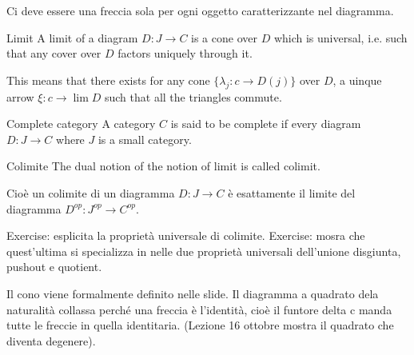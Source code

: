 \documentclass[a4paper]{article}
\begin{document}
Ci deve essere una freccia sola per ogni oggetto caratterizzante nel diagramma.

\begin{snippetdefinition}{Limit}
    A limit of a diagram \(D \colon J \to C\) is a cone over \(D\)
    which is universal, i.e. such that any cover over \(D\)
    factors uniquely through it.
\end{snippetdefinition}
\begin{center}
\end{center}
This means that there exists for any cone
\(\{\lambda_j \colon c \to D(j)\}\) over \(D\), a uinque arrow
\(\xi \colon c \to \lim D\) such that all the triangles commute.

\begin{snippetdefinition}{Complete category}
    A category \(C\) is said to be complete if every diagram
    \(D \colon J \to C\) where \(J\) is a small category.
\end{snippetdefinition}

\begin{snippetdefinition}{Colimite}
    The dual notion of the notion of limit is called colimit.
\end{snippetdefinition}

Cioè un colimite di un diagramma \(D \colon J \to C\)
è esattamente il limite del diagramma \(D^{op} \colon J^{op} \to C^{op}\).

Exercise: esplicita la proprietà universale di colimite. 
Exercise: mosra che quest'ultima si specializza in nelle due proprietà universali
dell'unione disgiunta, pushout e quotient.

Il cono viene formalmente definito nelle slide.
Il diagramma a quadrato dela naturalità collassa perché una freccia è l'identità,
cioè il funtore delta c manda tutte le freccie in quella identitaria.
(Lezione 16 ottobre mostra il quadrato che diventa degenere).
\end{document}
